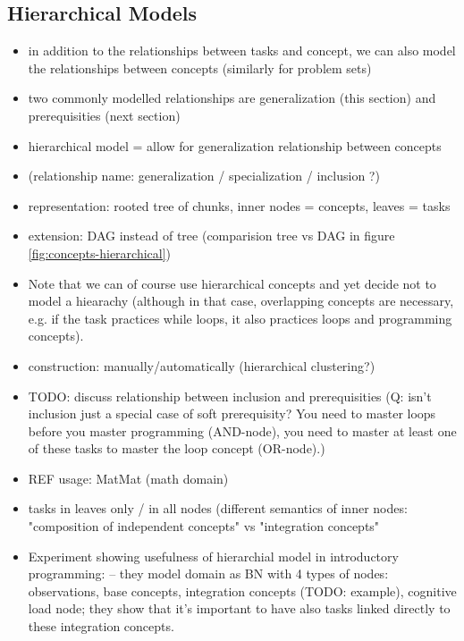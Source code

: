 \subsection{Hierarchical Models}

\begin{itemize}
\item in addition to the relationships between tasks and concept,
  we can also model the relationships between concepts
  (similarly for problem sets)
\item two commonly modelled relationships are generalization (this section) and
  prerequisities (next section)
\item hierarchical model = allow for generalization relationship between concepts
\item (relationship name: generalization / specialization / inclusion ?)
\item representation: rooted tree of chunks, inner nodes = concepts, leaves = tasks
\item extension: DAG instead of tree
  (comparision tree vs DAG in figure \ref{fig:concepts-hierarchical})
\item Note that we can of course use hierarchical concepts and yet decide not to
  model a hiearachy (although in that case, overlapping concepts are necessary,
  e.g. if the task practices while loops, it also practices loops and programming concepts).
\item construction: manually/automatically (hierarchical clustering?)
\item TODO: discuss relationship between inclusion and prerequisities
  (Q: isn't inclusion just a special case of soft prerequisity?
  You need to master loops before you master programming (AND-node),
  you need to master at least one of these tasks to master the loop concept (OR-node).)
\item REF usage: MatMat (math domain)
\item tasks in leaves only / in all nodes (different semantics of inner nodes:
  "composition of independent concepts" vs "integration concepts"
\item Experiment showing usefulness of hierarchial model in introductory programming:
  \cite{learner-models-integration-skills} -- they model domain as BN with 4
    types of nodes: observations, base concepts, integration concepts (TODO:
    example), cognitive load node; they show that it's important to have also
    tasks linked directly to these integration concepts.
\end{itemize}

